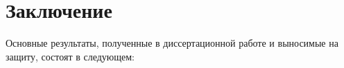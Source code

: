 \chapter*{Заключение}

Основные результаты, полученные в диссертационной работе и выносимые на защиту, состоят в следующем:

\Results


